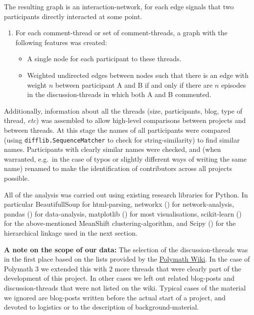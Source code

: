 \documentclass[article, floatfix, groupaddress, prb]{revtex4-1}
\providecommand{\tightlist}{%
      \setlength{\itemsep}{0pt}\setlength{\parskip}{0pt}}
\begin{document}
The resulting graph is an interaction-network, for each edge signals
that two participants directly interacted at some point.

\begin{enumerate}
\def\labelenumi{\arabic{enumi}.}
\setcounter{enumi}{2}
\item
  For each comment-thread or set of comment-threads, a graph with the
  following features was created:

  \begin{itemize}
  \tightlist
  \item
    A single node for each participant to these threads.
  \item
    Weighted undirected edges between nodes such that there is an edge
    with weight \(n\) between participant A and B if and only if there
    are \(n\) episodes in the discussion-threads in which both A and B
    commented.
  \end{itemize}
\end{enumerate}

Additionally, information about all the threads (size, participants,
blog, type of thread, \emph{etc}) was assembled to allow high-level
comparisons between projects and between threads. At this stage the
names of all participants were compared (using
\texttt{difflib.SequenceMatcher} to check for string-similarity) to find
similar names. Participants with clearly similar names were checked, and
(when warranted, e.g.~in the case of typos or slightly different ways of
writing the same name) renamed to make the identification of
contributors across all projects possible.

All of the analysis was carried out using existing research libraries
for Python. In particular BeautifullSoup for html-parsing, networkx
(\cite{hagberg-2008-exploring}) for network-analysis, pandas
(\cite{mckinney-proc-scipy-2010}) for data-analysis, matplotlib
(\cite{Hunter2007}) for most visualisations, scikit-learn
(\cite{scikit-learn}) for the above-mentioned MeanShift
clustering-algorithm, and Scipy (\cite{scipy}) for the hierarchical
linkage used in the next section.

\textbf{A note on the scope of our data:} The selection of the
discussion-threads was in the first place based on the lists provided by
the
\href{http://www.michaelnielsen.org/polymath1/index.php?title=Main_Page}{Polymath
Wiki}. In the case of Polymath 3 we extended this with 2 more threads
that were clearly part of the development of this project. In other
cases we left out related blog-posts and discussion-threads that were
not listed on the wiki. Typical cases of the material we ignored are
blog-posts written before the actual start of a project, and devoted to
logistics or to the description of background-material.
\end{document}
